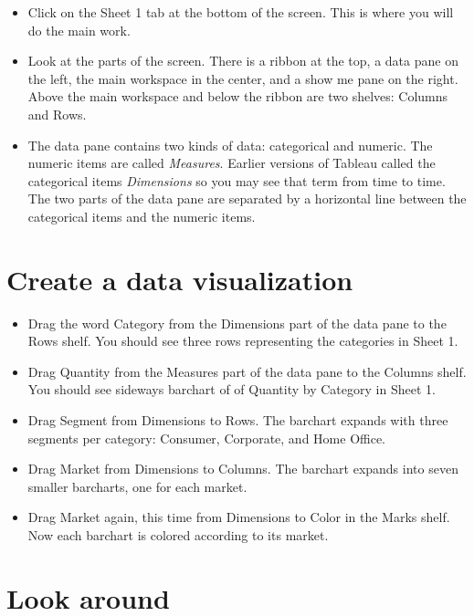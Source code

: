 \begin{itemize}
\tightlist
\item
  Click on the Sheet 1 tab at the bottom of the screen. This is where
  you will do the main work.
\item
  Look at the parts of the screen. There is a ribbon at the top, a data
  pane on the left, the main workspace in the center, and a show me pane
  on the right. Above the main workspace and below the ribbon are two
  shelves: Columns and Rows.
\item
  The data pane contains two kinds of data: categorical and numeric. The
  numeric items are called \emph{Measures}. Earlier versions of Tableau
  called the categorical items \emph{Dimensions} so you may see that
  term from time to time. The two parts of the data pane are separated
  by a horizontal line between the categorical items and the numeric
  items.
\end{itemize}

\section{Create a data visualization}\label{create-a-data-visualization}

\begin{itemize}
\tightlist
\item
  Drag the word Category from the Dimensions part of the data pane to
  the Rows shelf. You should see three rows representing the categories
  in Sheet 1.
\item
  Drag Quantity from the Measures part of the data pane to the Columns
  shelf. You should see sideways barchart of of Quantity by Category in
  Sheet 1.
\item
  Drag Segment from Dimensions to Rows. The barchart expands with three
  segments per category: Consumer, Corporate, and Home Office.
\item
  Drag Market from Dimensions to Columns. The barchart expands into
  seven smaller barcharts, one for each market.
\item
  Drag Market again, this time from Dimensions to Color in the Marks
  shelf. Now each barchart is colored according to its market.
\end{itemize}

\section{Look around}\label{look-around}

